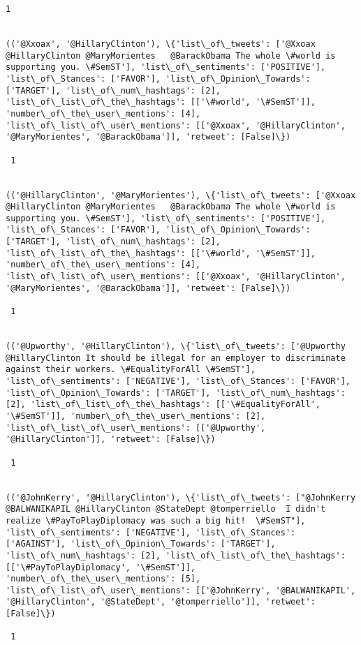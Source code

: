 \documentclass[11pt]{article}
\begin{document}
\begin{Verbatim}[commandchars=\\\{\}]
 1
 

(('@Xxoax', '@HillaryClinton'), \{'list\_of\_tweets': ['@Xxoax @HillaryClinton @MaryMorientes   @BarackObama The whole \#world is supporting you. \#SemST'], 'list\_of\_sentiments': ['POSITIVE'], 'list\_of\_Stances': ['FAVOR'], 'list\_of\_Opinion\_Towards': ['TARGET'], 'list\_of\_num\_hashtags': [2], 'list\_of\_list\_of\_the\_hashtags': [['\#world', '\#SemST']], 'number\_of\_the\_user\_mentions': [4], 'list\_of\_list\_of\_user\_mentions': [['@Xxoax', '@HillaryClinton', '@MaryMorientes', '@BarackObama']], 'retweet': [False]\})

 1
 

(('@HillaryClinton', '@MaryMorientes'), \{'list\_of\_tweets': ['@Xxoax @HillaryClinton @MaryMorientes   @BarackObama The whole \#world is supporting you. \#SemST'], 'list\_of\_sentiments': ['POSITIVE'], 'list\_of\_Stances': ['FAVOR'], 'list\_of\_Opinion\_Towards': ['TARGET'], 'list\_of\_num\_hashtags': [2], 'list\_of\_list\_of\_the\_hashtags': [['\#world', '\#SemST']], 'number\_of\_the\_user\_mentions': [4], 'list\_of\_list\_of\_user\_mentions': [['@Xxoax', '@HillaryClinton', '@MaryMorientes', '@BarackObama']], 'retweet': [False]\})

 1
 

(('@Upworthy', '@HillaryClinton'), \{'list\_of\_tweets': ['@Upworthy @HillaryClinton It should be illegal for an employer to discriminate against their workers. \#EqualityForAll \#SemST'], 'list\_of\_sentiments': ['NEGATIVE'], 'list\_of\_Stances': ['FAVOR'], 'list\_of\_Opinion\_Towards': ['TARGET'], 'list\_of\_num\_hashtags': [2], 'list\_of\_list\_of\_the\_hashtags': [['\#EqualityForAll', '\#SemST']], 'number\_of\_the\_user\_mentions': [2], 'list\_of\_list\_of\_user\_mentions': [['@Upworthy', '@HillaryClinton']], 'retweet': [False]\})

 1
 

(('@JohnKerry', '@HillaryClinton'), \{'list\_of\_tweets': ["@JohnKerry @BALWANIKAPIL @HillaryClinton @StateDept @tomperriello  I didn't realize \#PayToPlayDiplomacy was such a big hit!  \#SemST"], 'list\_of\_sentiments': ['NEGATIVE'], 'list\_of\_Stances': ['AGAINST'], 'list\_of\_Opinion\_Towards': ['TARGET'], 'list\_of\_num\_hashtags': [2], 'list\_of\_list\_of\_the\_hashtags': [['\#PayToPlayDiplomacy', '\#SemST']], 'number\_of\_the\_user\_mentions': [5], 'list\_of\_list\_of\_user\_mentions': [['@JohnKerry', '@BALWANIKAPIL', '@HillaryClinton', '@StateDept', '@tomperriello']], 'retweet': [False]\})

 1
 


\end{Verbatim}
\end{document}
